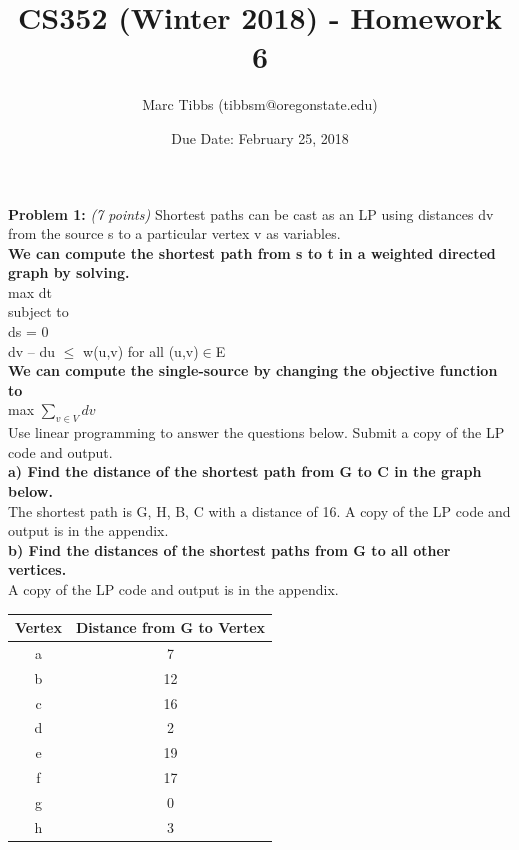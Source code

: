 \documentclass{article}
\title{CS352 (Winter 2018) - Homework 6}
\author{Marc Tibbs (tibbsm@oregonstate.edu)}
\date{Due Date: February 25, 2018}
\begin{document}
\maketitle

\noindent \textbf{Problem 1:} \textit{(7 points)} Shortest paths can be cast as an LP using distances dv from the source s to a particular vertex v as variables.\\

\noindent \textbf{We can compute the shortest path from s to t in a weighted directed graph by solving.}\\
max dt \\
subject to\\
\indent ds = 0\\
\indent dv – du $\leq$ w(u,v) for all (u,v)$\in$E
\\[.25cm]

\noindent \textbf{We can compute the single-source by changing the objective function to}\\
max $\sum_{v\in V} dv$
\\[.25cm]

\noindent Use linear programming to answer the questions below. Submit a copy of the LP code and output.
\\[.25cm]

\noindent \textbf{a) Find the distance of the shortest path from G to C in the graph below.}\\
The shortest path is G, H, B, C with a distance of 16. A copy of the LP code and output is in the appendix.
\\[.25cm]

\noindent \textbf{b) Find the distances of the shortest paths from G to all other vertices.}\\
A copy of the LP code and output is in the appendix.
\\[.25cm]
\begin{center}
 \begin{tabular}{|| c | c ||} 
 \hline
 Vertex & Distance from G to Vertex\\ 
 \hline\hline
 a & 7 \\ 
 \hline
 b & 12 \\
 \hline
 c & 16 \\
 \hline
 d & 2 \\
 \hline
 e & 19 \\
 \hline
 f & 17 \\
 \hline
 g & 0 \\
 \hline
 h & 3 \\
 \hline
\end{tabular}
\end{center}
\end{document}
